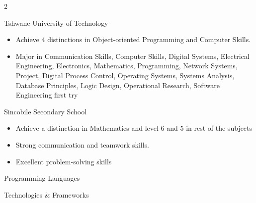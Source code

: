 \documentclass[14pt,a4paper,ragged2e,withhyper]{altacv}
\begin{document}
\begin{paracol}{2}


        {Tshwane University of Technology}{}
\begin{itemize}
    \item Achieve 4 distinctions in Object-oriented Programming and Computer Skills.
    \item Major in Communication Skills, Computer Skills, Digital Systems, Electrical Engineering, Electronics, Mathematics, Programming, Network Systems, Project, Digital Process Control, Operating Systems, Systems Analysis, Database Principles, Logic Design, Operational Research, Software Engineering first try
\end{itemize}

\divider

    {Sincobile Secondary School}{}
\begin{itemize}
    \item Achieve a distinction in Mathematics and level 6 and 5 in rest of the subjects  %
\end{itemize}

\switchcolumn

\normalsize
\begin{itemize}
    \item Strong communication and teamwork skills.
    \item Excellent problem-solving skills %
\end{itemize}

\divider\smallskip

\large{Programming Languages }\smallskip\par\normalsize
{}  
    

\divider\smallskip

\large{Technologies \& Frameworks}\smallskip\par\normalsize
{}   
  
  
 



\end{paracol}
\end{document}
